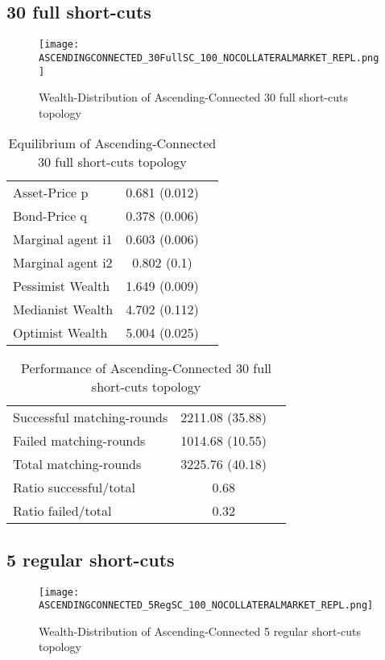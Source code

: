 \documentclass[Bachelorarbeit.tex]{subfiles}
\begin{document}
\subsection{30 full short-cuts}
\begin{figure}[H]
	\centering
  \texttt{[image: ASCENDINGCONNECTED\_30FullSC\_100\_NOCOLLATERALMARKET\_REPL.png]}
	\caption{Wealth-Distribution of Ascending-Connected 30 full short-cuts topology}
	\label{fig:wealth_ASCENDINGCONNECTED_30FullSC_100_NOCOLLATERALMARKET_REPL}
\end{figure}

\begin{table}[H]
	\caption{Equilibrium of Ascending-Connected 30 full short-cuts topology}
	\centering
	\begin{tabular} { l c r }
		\hline
		Asset-Price p & 0.681 (0.012) \\
		Bond-Price q & 0.378 (0.006) \\
		Marginal agent i1 & 0.603 (0.006) \\
		Marginal agent i2 & 0.802 (0.1) \\
		\hline
		Pessimist Wealth & 1.649 (0.009) \\
		Medianist Wealth & 4.702 (0.112) \\
		Optimist Wealth & 5.004 (0.025) \\
		\hline
	\end{tabular}
\end{table} 

\begin{table}[H]
	\caption{Performance of Ascending-Connected 30 full short-cuts topology}
	\centering
	\begin{tabular} { l c r }
		\hline
		Successful matching-rounds& 2211.08 (35.88) \\
		Failed matching-rounds & 1014.68 (10.55) \\
		Total matching-rounds & 3225.76 (40.18) \\
		\hline
		Ratio successful/total & 0.68 \\
		Ratio failed/total & 0.32 \\
		\hline
	\end{tabular}
\end{table}


\subsection{5 regular short-cuts}
\begin{figure}[H]
	\centering
  \texttt{[image: ASCENDINGCONNECTED\_5RegSC\_100\_NOCOLLATERALMARKET\_REPL.png]}
	\caption{Wealth-Distribution of Ascending-Connected 5 regular short-cuts topology}
	\label{fig:wealth_ASCENDINGCONNECTED_5RegSC_100_NOCOLLATERALMARKET_REPL}
\end{figure}
\end{document}
